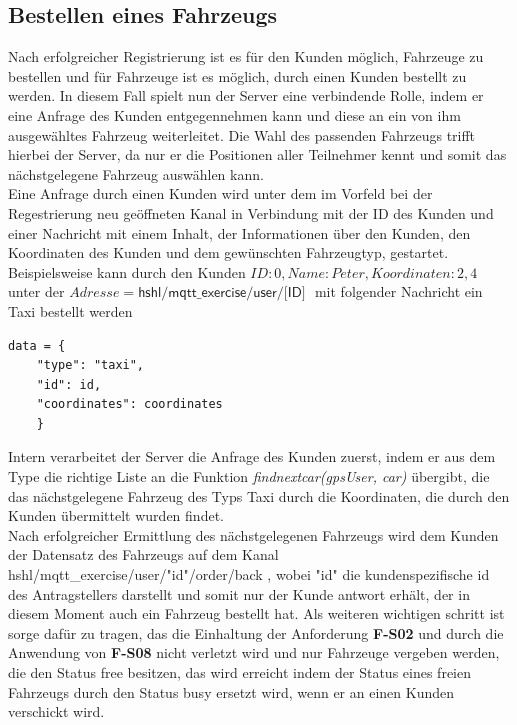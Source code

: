 \subsection{Bestellen eines Fahrzeugs}
Nach erfolgreicher Registrierung ist es für den Kunden möglich, Fahrzeuge zu bestellen und für Fahrzeuge ist es möglich, durch einen Kunden bestellt zu werden. In diesem Fall spielt nun der Server eine verbindende Rolle, indem er eine Anfrage des Kunden entgegennehmen kann und diese an ein von ihm ausgewähltes Fahrzeug weiterleitet. Die Wahl des passenden Fahrzeugs trifft hierbei der Server, da nur er die Positionen aller Teilnehmer kennt und somit das nächstgelegene Fahrzeug auswählen kann.\\
Eine Anfrage durch einen Kunden wird unter dem im Vorfeld bei der Regestrierung neu geöffneten Kanal in Verbindung mit der ID des Kunden und einer Nachricht mit einem Inhalt, der Informationen über den Kunden, den Koordinaten des Kunden und dem gewünschten Fahrzeugtyp, gestartet. Beispielsweise kann durch den Kunden $ID: 0, Name: Peter, Koordinaten: 2,4$ unter der $Adresse=\textsf{hshl/mqtt\_exercise/user/[ID] }$ mit folgender Nachricht ein Taxi bestellt werden \begin{lstlisting}
data = {
	"type": "taxi",
    "id": id,
    "coordinates": coordinates
    }
\end{lstlisting}
Intern verarbeitet der Server die Anfrage des Kunden zuerst, indem er aus dem Type die richtige Liste an die Funktion \textit{findnextcar(gpsUser, car)} übergibt, die das nächstgelegene Fahrzeug des Typs Taxi durch die Koordinaten, die durch den Kunden übermittelt wurden findet.\\
Nach erfolgreicher Ermittlung des nächstgelegenen Fahrzeugs wird dem Kunden der Datensatz des Fahrzeugs auf dem Kanal \textsf{hshl/mqtt\_exercise/user/"id"/order/back} , wobei "id"  die kundenspezifische id des Antragstellers darstellt und somit nur der Kunde antwort erhält, der in diesem Moment auch ein Fahrzeug bestellt hat. Als weiteren wichtigen schritt ist sorge dafür zu tragen, das die Einhaltung der Anforderung \textbf{F-S02} und durch die Anwendung von \textbf{F-S08}  nicht verletzt wird und nur Fahrzeuge vergeben werden, die den Status free besitzen, das wird erreicht indem der Status eines freien Fahrzeugs durch den Status busy ersetzt wird, wenn er an einen Kunden verschickt wird.
